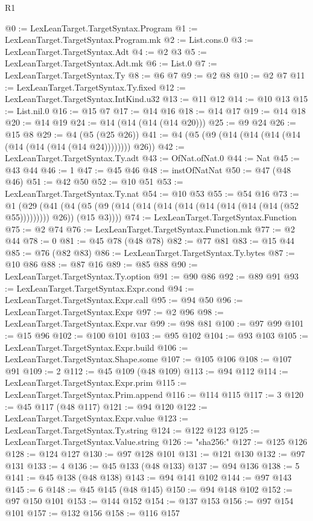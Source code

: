 \begin{lexlean}{R1}
\begin{coremodule}
@0 := LexLeanTarget.TargetSyntax.Program
@1 := LexLeanTarget.TargetSyntax.Program.mk
@2 := List.cons.{0}
@3 := LexLeanTarget.TargetSyntax.Adt
@4 := @2 @3
@5 := LexLeanTarget.TargetSyntax.Adt.mk
@6 := List.{0}
@7 := LexLeanTarget.TargetSyntax.Ty
@8 := @6 @7
@9 := @2 @8
@10 := @2 @7
@11 := LexLeanTarget.TargetSyntax.Ty.fixed
@12 := LexLeanTarget.TargetSyntax.IntKind.u32
@13 := @11 @12
@14 := @10 @13
@15 := List.nil.{0}
@16 := @15 @7
@17 := @14 @16
@18 := @14 @17
@19 := @14 @18
@20 := @14 @19
@24 := @14 (@14 (@14 (@14 @20)))
@25 := @9 @24
@26 := @15 @8
@29 := @4 (@5 (@25 @26))
@41 := @4 (@5 (@9 (@14 (@14 (@14 (@14 (@14 (@14 (@14 (@14 @24)))))))) @26))
@42 := LexLeanTarget.TargetSyntax.Ty.adt
@43 := OfNat.ofNat.{0}
@44 := Nat
@45 := @43 @44
@46 := 1
@47 := @45 @46
@48 := instOfNatNat
@50 := @47 (@48 @46)
@51 := @42 @50
@52 := @10 @51
@53 := LexLeanTarget.TargetSyntax.Ty.nat
@54 := @10 @53
@55 := @54 @16
@73 := @1
    (@29
      (@41 (@4 (@5 (@9 (@14 (@14 (@14 (@14 (@14 (@14 (@14 (@14 (@52 @55))))))))) @26)) (@15 @3))))
@74 := LexLeanTarget.TargetSyntax.Function
@75 := @2 @74
@76 := LexLeanTarget.TargetSyntax.Function.mk
@77 := @2 @44
@78 := 0
@81 := @45 @78 (@48 @78)
@82 := @77 @81
@83 := @15 @44
@85 := @76 (@82 @83)
@86 := LexLeanTarget.TargetSyntax.Ty.bytes
@87 := @10 @86
@88 := @87 @16
@89 := @85 @88
@90 := LexLeanTarget.TargetSyntax.Ty.option
@91 := @90 @86
@92 := @89 @91
@93 := LexLeanTarget.TargetSyntax.Expr.cond
@94 := LexLeanTarget.TargetSyntax.Expr.call
@95 := @94 @50
@96 := LexLeanTarget.TargetSyntax.Expr
@97 := @2 @96
@98 := LexLeanTarget.TargetSyntax.Expr.var
@99 := @98 @81
@100 := @97 @99
@101 := @15 @96
@102 := @100 @101
@103 := @95 @102
@104 := @93 @103
@105 := LexLeanTarget.TargetSyntax.Expr.build
@106 := LexLeanTarget.TargetSyntax.Shape.some
@107 := @105 @106
@108 := @107 @91
@109 := 2
@112 := @45 @109 (@48 @109)
@113 := @94 @112
@114 := LexLeanTarget.TargetSyntax.Expr.prim
@115 := LexLeanTarget.TargetSyntax.Prim.append
@116 := @114 @115
@117 := 3
@120 := @45 @117 (@48 @117)
@121 := @94 @120
@122 := LexLeanTarget.TargetSyntax.Expr.value
@123 := LexLeanTarget.TargetSyntax.Ty.string
@124 := @122 @123
@125 := LexLeanTarget.TargetSyntax.Value.string
@126 := "sha256:"
@127 := @125 @126
@128 := @124 @127
@130 := @97 @128 @101
@131 := @121 @130
@132 := @97 @131
@133 := 4
@136 := @45 @133 (@48 @133)
@137 := @94 @136
@138 := 5
@141 := @45 @138 (@48 @138)
@143 := @94 @141 @102
@144 := @97 @143
@145 := 6
@148 := @45 @145 (@48 @145)
@150 := @94 @148 @102
@152 := @97 @150 @101
@153 := @144 @152
@154 := @137 @153
@156 := @97 @154 @101
@157 := @132 @156
@158 := @116 @157

\end{coremodule}
\end{lexlean}
